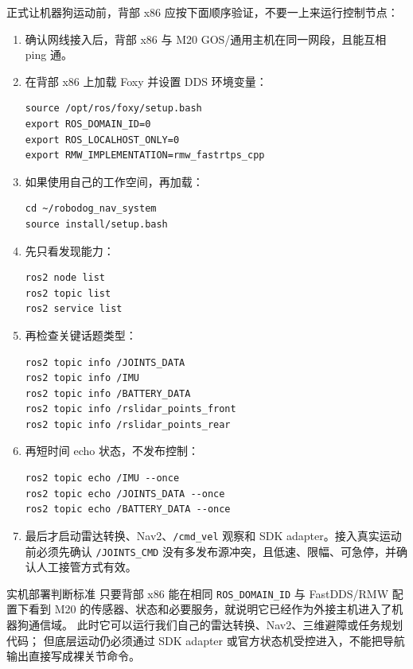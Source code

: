 \documentclass[UTF8,11pt,a4paper]{ctexart}
\begin{document}
正式让机器狗运动前，背部 x86 应按下面顺序验证，不要一上来运行控制节点：

\begin{enumerate}
  \item 确认网线接入后，背部 x86 与 M20 GOS/通用主机在同一网段，且能互相 ping 通。
  \item 在背部 x86 上加载 Foxy 并设置 DDS 环境变量：
\begin{verbatim}
source /opt/ros/foxy/setup.bash
export ROS_DOMAIN_ID=0
export ROS_LOCALHOST_ONLY=0
export RMW_IMPLEMENTATION=rmw_fastrtps_cpp
\end{verbatim}
  \item 如果使用自己的工作空间，再加载：
\begin{verbatim}
cd ~/robodog_nav_system
source install/setup.bash
\end{verbatim}
  \item 先只看发现能力：
\begin{verbatim}
ros2 node list
ros2 topic list
ros2 service list
\end{verbatim}
  \item 再检查关键话题类型：
\begin{verbatim}
ros2 topic info /JOINTS_DATA
ros2 topic info /IMU
ros2 topic info /BATTERY_DATA
ros2 topic info /rslidar_points_front
ros2 topic info /rslidar_points_rear
\end{verbatim}
  \item 再短时间 echo 状态，不发布控制：
\begin{verbatim}
ros2 topic echo /IMU --once
ros2 topic echo /JOINTS_DATA --once
ros2 topic echo /BATTERY_DATA --once
\end{verbatim}
  \item 最后才启动雷达转换、Nav2、\texttt{/cmd\_vel} 观察和 SDK adapter。接入真实运动前必须先确认 \texttt{/JOINTS\_CMD} 没有多发布源冲突，且低速、限幅、可急停，并确认人工接管方式有效。
\end{enumerate}

\begin{redbox}{实机部署判断标准}
只要背部 x86 能在相同 \texttt{ROS\_DOMAIN\_ID} 与 FastDDS/RMW 配置下看到 M20 的传感器、状态和必要服务，就说明它已经作为外接主机进入了机器狗通信域。
此时它可以运行我们自己的雷达转换、Nav2、三维避障或任务规划代码；
但底层运动仍必须通过 SDK adapter 或官方状态机受控进入，不能把导航输出直接写成裸关节命令。
\end{redbox}
\end{document}
